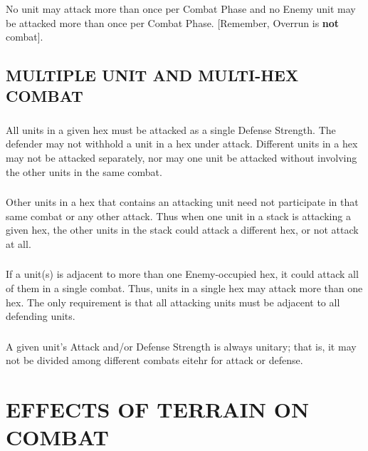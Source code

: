 \subsubsection{} No unit may attack more than once per Combat Phase and no Enemy unit may be attacked more than once per Combat Phase. [Remember, Overrun is \textbf{not} combat].

\subsection{MULTIPLE UNIT AND MULTI-HEX COMBAT}

\subsubsection{} All units in a given hex must be attacked as a single Defense Strength. The defender may not withhold a unit in a hex under attack. Different units in a hex may not be attacked separately, nor may one unit be attacked without involving the other units in the same combat.

\subsubsection{} Other units in a hex that contains an attacking unit need not participate in that same combat or any other attack. Thus when one unit in a stack is attacking a given hex, the other units in the stack could attack a different hex, or not attack at all.

\subsubsection{} If a unit(s) is adjacent to more than one Enemy-occupied hex, it could attack all of them in a single combat. Thus, units in a single hex may attack more than one hex. The only requirement is that all attacking units must be adjacent to all defending units.

\subsubsection{} A given unit's Attack and/or Defense Strength is always unitary; that is, it may not be divided among different combats eitehr for attack or defense.

\section{EFFECTS OF TERRAIN ON COMBAT}

